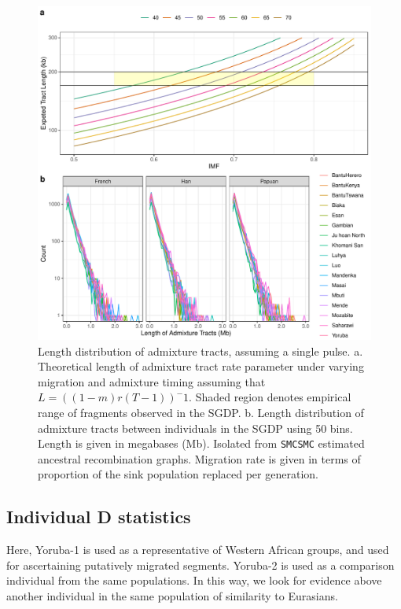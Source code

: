 \documentclass{article}
\begin{document}
\begin{figure}
    \centering
    \includegraphics[width=\textwidth]{plot/both_length.pdf}
    \caption{Length distribution of admixture tracts, assuming a single pulse.  a. Theoretical length of admixture tract rate parameter under varying migration and admixture timing assuming that $L = ((1-m)r(T-1))^-1$. Shaded region denotes empirical range of fragments observed in the SGDP. b. Length distribution of admixture tracts between individuals in the SGDP using 50 bins. Length is given in megabases (Mb). Isolated from {\tt SMCSMC} estimated ancestral recombination graphs. Migration rate is given in terms of proportion of the sink population replaced per generation. }
    \label{fig:length}
\end{figure}

\clearpage
\subsection{Individual D statistics}

Here, Yoruba-1 is used as a representative of Western African groups, and used for ascertaining putatively migrated segments. Yoruba-2 is used as a comparison individual from the same populations. In this way, we look for evidence above another individual in the same population of similarity to Eurasians.
\end{document}
